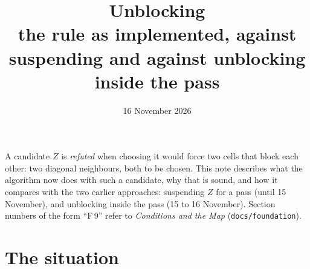 \documentclass[10pt,a4paper]{article}
\title{\textsf{Unblocking}\\[0.3em]\large the rule as implemented, against suspending and against unblocking inside the pass}
\date{16 November 2026}
\author{}
\newcommand{\code}[1]{\texttt{#1}}
\begin{document}
\maketitle
\thispagestyle{empty}

A candidate $Z$ is \emph{refuted} when choosing it would force two cells that block each other: two diagonal neighbours, both to be chosen. This note describes what the algorithm now does with such a candidate, why that is sound, and how it compares with the two earlier approaches: suspending $Z$ for a pass (until 15 November), and unblocking inside the pass (15 to 16 November). Section numbers of the form ``F\,9'' refer to \emph{Conditions and the Map} (\code{docs/foundation}).

\section{The situation}
\end{document}
